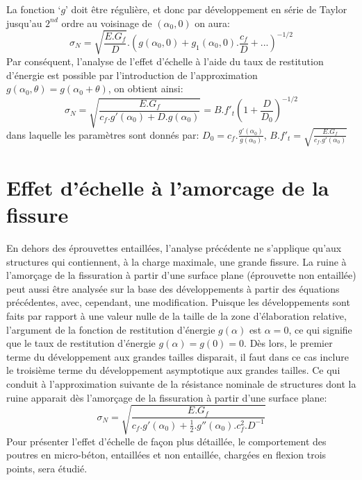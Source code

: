 \documentclass[12pt]{report}
\begin{document}
\\\\
La fonction ‘$g$' doit être régulière, et donc par développement en série de Taylor jusqu'au $2^{nd}$ ordre au voisinage de $(\alpha_0, 0)$ on aura:
\[\sigma_N = \sqrt{\frac{E.G_f}{D}}.(g(\alpha_0, 0)+g_1(\alpha_0, 0).\frac{c_f}{D}+...)^{-1/2}\]
Par conséquent, l'analyse de l'effet d'échelle à l'aide du taux de restitution d'énergie est possible par l'introduction de l'approximation $g(\alpha_0, \theta) = g(\alpha_0 + \theta)$, on obtient ainsi:
\begin{equation}
\sigma_N = \sqrt{\frac{E.G_f}{c_f.g'(\alpha_0)+D.g(\alpha_0)}} = B.f'_{t}(1+\frac{D}{D_0})^{-1/2}
\end{equation}
dans laquelle les paramètres sont donnés par: $D_0 = c_f.\frac{g'(\alpha_0)}{g(\alpha_0)}$, $B.f'_{t}=\sqrt{\frac{E.G_f}{c_f.g'(\alpha_0)}}$



\section{Effet d'échelle à l'amorcage de la fissure}
En dehors des éprouvettes entaillées,
l'analyse précédente ne s'applique qu'aux structures qui contiennent, à la charge maximale, une
grande fissure. La ruine à l'amorçage de la fissuration à partir d'une surface plane (éprouvette
non entaillée) peut aussi être analysée sur la base des développements à partir des équations
précédentes, avec, cependant, une modification. Puisque les développements sont faits par
rapport à une valeur nulle de la taille de la zone d'élaboration relative, l'argument de la fonction
de restitution d'énergie $g(\alpha)$ est $\alpha=0$, ce qui signifie que le taux de restitution d'énergie
$g(\alpha)=g(0)=0$. Dès lors, le premier terme du développement aux grandes tailles disparait, il faut
dans ce cas inclure le troisième terme du développement asymptotique aux grandes tailles. Ce
qui conduit à l'approximation suivante de la résistance nominale de structures dont la ruine
apparait dès l'amorçage de la fissuration à partir d'une surface plane:
\begin{equation}
\sigma_N = \sqrt{\frac{E.G_f}{c_f.g'(\alpha_0)+\frac{1}{2}.g''(\alpha_0).c_{f}^{2} .D^{-1}}}
\end{equation}
Pour présenter l'effet d'échelle de façon plus détaillée, le comportement des poutres en
micro-béton, entaillées et non entaillée, chargées en flexion trois points, sera étudié.
\end{document}
